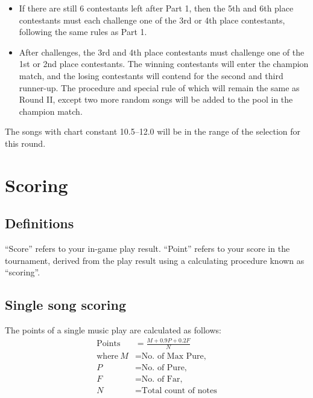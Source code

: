 \documentclass{article}
\newcommand{\alert}[1]{{\color{red} #1}}
\newcommand{\srbgcolor}{red!40}
\begin{document}
\begin{itemize}
	\item If there are still 6 contestants left after Part 1,
	      then the 5th and 6th place contestants must each challenge
	      one of the 3rd or 4th place contestants,
	      following the same rules as Part 1.

	\item After challenges, the 3rd and 4th place contestants
	      must challenge one of the 1st or 2nd place contestants.
	      The winning contestants will enter the champion match,
	      and the losing contestants will contend for the
	      second and third runner-up.
	      The procedure and \colorbox{\srbgcolor}{special rule} of which
	      will remain the same as Round II,
	      except two more random songs will be added
	      to the pool in the champion match.
\end{itemize}

\alert{
	The songs with chart constant 10.5--12.0
	will be in the range of the selection for this round.
}

\section{Scoring}

\subsection{Definitions}
``Score'' refers to your in-game play result.
``Point'' refers to your score in the tournament,  %
derived from the play result
using a calculating procedure known as ``scoring''.

\newcommand{\Points}{\text{Points}}

\subsection{Single song scoring}
The points of a single music play are calculated as follows:
\alert{
	\begin{align*}
		\Points        & = \frac{M + 0.9P + 0.2F}{N}   \\
		\text{where}~M & = \text{No.~of Max Pure,}     \\
		P              & = \text{No.~of Pure,}         \\
		F              & = \text{No.~of Far,}          \\
		N              & = \text{Total count of notes}
	\end{align*}
}
\end{document}
